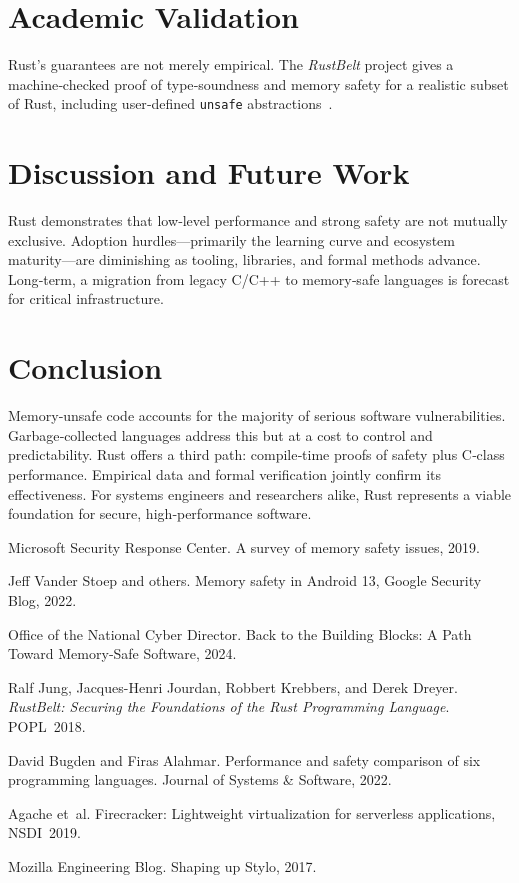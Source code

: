 \documentclass[11pt]{article}
\begin{document}
\section{Academic Validation}
Rust’s guarantees are not merely empirical.
The \emph{RustBelt} project gives a machine‑checked proof of
type‑soundness and memory safety for a realistic subset of Rust,
including user‑defined \texttt{unsafe} abstractions~\cite{jung2018rustbelt}.

\section{Discussion and Future Work}
Rust demonstrates that low‑level performance and strong safety
are not mutually exclusive.
Adoption hurdles—primarily the learning curve and ecosystem maturity—are
diminishing as tooling, libraries, and formal methods advance.
Long‑term, a migration from legacy C/C++ to memory‑safe languages is forecast
for critical infrastructure.

\section{Conclusion}
Memory‑unsafe code accounts for the majority of serious software
vulnerabilities.
Garbage‑collected languages address this but at a cost to control and
predictability.
Rust offers a third path: compile‑time proofs of safety plus C‑class
performance.
Empirical data and formal verification jointly confirm its
effectiveness.
For systems engineers and researchers alike, Rust represents a viable
foundation for secure, high‑performance software.

\newpage

\begin{thebibliography}{10}

Microsoft Security Response Center.
\newblock A survey of memory safety issues, 2019.

Jeff Vander Stoep and others.
\newblock Memory safety in {Android} 13, Google Security Blog, 2022. 

Office of the National Cyber Director.
\newblock Back to the Building Blocks: A Path Toward {Memory‑Safe} Software,
  2024.

Ralf Jung, Jacques-Henri Jourdan, Robbert Krebbers, and Derek Dreyer.
\newblock \emph{RustBelt: Securing the Foundations of the Rust Programming
  Language}.
\newblock POPL~2018.

David Bugden and Firas Alahmar.
\newblock Performance and safety comparison of six programming languages.
\newblock Journal of Systems \& Software, 2022.

Agache et~al.
\newblock Firecracker: Lightweight virtualization for serverless applications,
  NSDI~2019.

Mozilla Engineering Blog.
\newblock Shaping up {Stylo}, 2017.

\end{thebibliography}
\end{document}
